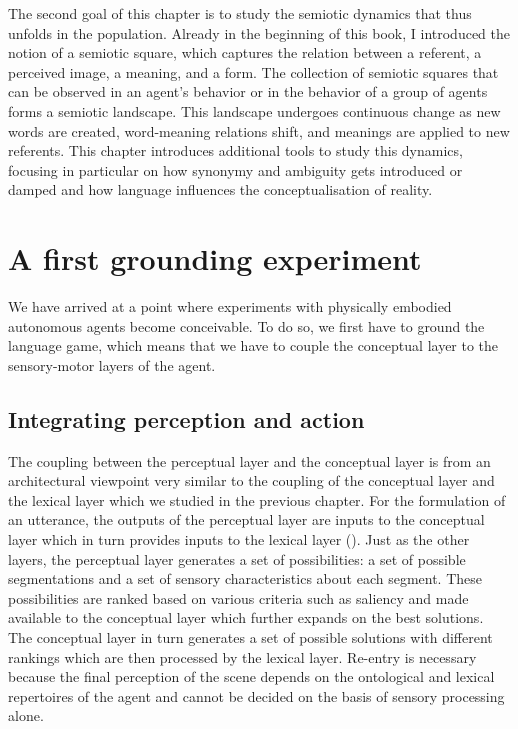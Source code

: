 The second goal of this chapter is to study the semiotic
dynamics that thus unfolds in the population. 
Already in the beginning of this book, I introduced the 
notion of a semiotic square, which captures the relation
between a referent, a perceived image, 
a meaning, and a form. The collection 
of semiotic squares that can be observed in an agent's
behavior or in the behavior of a group of agents
forms a semiotic landscape. This landscape undergoes
continuous change as new words are created, word-meaning relations
shift, and meanings are applied to new referents. 
This chapter introduces additional tools to study this dynamics, 
focusing in particular on how synonymy and ambiguity gets
introduced or damped and how language influences the 
conceptualisation of reality. 

\section{A first grounding experiment}

We have arrived at a point where experiments with 
physically embodied autonomous agents become 
conceivable. To do so, we first have to ground the language
game, which means that we have to couple the 
conceptual layer to the sensory-motor layers 
of the agent. 

\subsection{Integrating perception and action}

The coupling between the perceptual layer and the 
conceptual layer is from an architectural viewpoint
very similar to the coupling of the conceptual 
layer and the lexical layer which we studied in 
the previous chapter. For the formulation of
an utterance, the outputs of the perceptual layer are inputs
to the conceptual layer which in turn provides 
inputs to the lexical layer (). 
Just as the other layers, 
the perceptual layer generates a set of possibilities:
a set of possible segmentations and a set 
of sensory characteristics
about each segment. These possibilities are ranked based
on various criteria
such as saliency and made available to the conceptual layer 
which further expands on the best solutions. The conceptual
layer in turn generates a set of possible solutions with different
rankings which are then processed by the lexical layer. 
Re-entry is necessary because the final perception of the 
scene depends on the ontological and lexical repertoires of
the agent and cannot be decided on the basis of sensory 
processing alone. 


